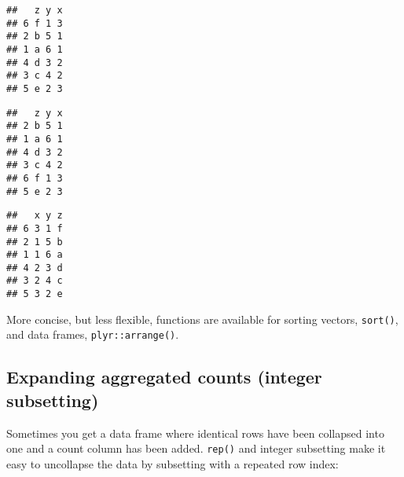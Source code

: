 \begin{Shaded}
\begin{Highlighting}[]
\StringTok{ }\NormalTok{df[}\NormalTok{(}\OperatorTok{:}\NormalTok{]}
\end{Highlighting}
\end{Shaded}

\begin{verbatim}
##   z y x
## 6 f 1 3
## 2 b 5 1
## 1 a 6 1
## 4 d 3 2
## 3 c 4 2
## 5 e 2 3
\end{verbatim}

\begin{Shaded}
\begin{Highlighting}[]
\NormalTok{df2[}\OperatorTok{$}\NormalTok{x), ]}
\end{Highlighting}
\end{Shaded}

\begin{verbatim}
##   z y x
## 2 b 5 1
## 1 a 6 1
## 4 d 3 2
## 3 c 4 2
## 6 f 1 3
## 5 e 2 3
\end{verbatim}

\begin{Shaded}
\begin{Highlighting}[]
\NormalTok{df2[, }\NormalTok{(}\NormalTok{(df2))]}
\end{Highlighting}
\end{Shaded}

\begin{verbatim}
##   x y z
## 6 3 1 f
## 2 1 5 b
## 1 1 6 a
## 4 2 3 d
## 3 2 4 c
## 5 3 2 e
\end{verbatim}

More concise, but less flexible, functions are available for sorting
vectors, \texttt{sort()}, and data frames, \texttt{plyr::arrange()}.

\hypertarget{expanding-aggregated-counts-integer-subsetting}{%
\subsection{Expanding aggregated counts (integer
subsetting)}\label{expanding-aggregated-counts-integer-subsetting}}

Sometimes you get a data frame where identical rows have been collapsed
into one and a count column has been added. \texttt{rep()} and integer
subsetting make it easy to uncollapse the data by subsetting with a
repeated row index:

